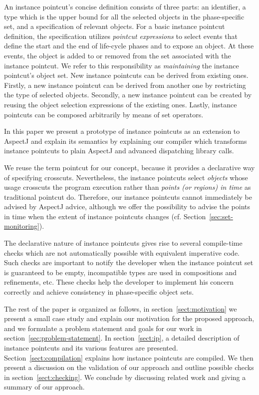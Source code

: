 An instance pointcut's concise definition consists of three parts: an identifier, a type which is the upper bound for all the selected objects in the phase-specific set, and a specification of relevant objects.
For a basic instance pointcut definition, the specification utilizes \emph{pointcut expressions} to select events that define the start and the end of life-cycle phases and to expose an object. At these events, the object is added to or removed from the set associated with the instance pointcut. We refer to this responsibility as \emph{maintaining} the instance pointcut's object set.
New instance pointcuts can be derived from existing ones. Firstly, a new instance pointcut can be derived from another one by restricting the type of selected objects.
Secondly, a new instance pointcut can be created by reusing the object selection expressions of the existing ones.
Lastly, instance pointcuts can be composed arbitrarily by means of set operators.

In this paper we present a prototype of instance pointcuts as an extension to AspectJ \cite{kiczales2001overview} and explain its semantics by explaining our compiler which transforms instance pointcuts to plain AspectJ and advanced dispatching library calls.

We reuse the term pointcut for our concept, because it provides a declarative way of specifying crosscuts.
Nevertheless, the instance pointcuts select \emph{objects} whose usage crosscuts the program execution rather than \emph{points (or regions) in time} \cite{masuharafine} as traditional pointcut do.
Therefore, our instance pointcuts cannot immediately be advised by AspectJ advice, although we offer the possibility to advise the points in time when the extent of instance pointcuts changes (cf. Section~\ref{sec:set-monitoring}).

The declarative nature of instance pointcuts gives rise to several compile-time checks which are not automatically possible with equivalent imperative code.
Such checks are important to notify the developer when the instance pointcut set is guaranteed to be empty, incompatible types are used in compositions and refinements, etc.  These checks help the developer to implement his concern correctly and achieve consistency in phase-specific object sets.


The rest of the paper is organized as follows, in section~\ref{sect:motivation} we present a small case study and explain our motivation for the proposed approach, and we formulate a problem statement and goals for our work in section~\ref{sec:problem-statement}. In section~\ref{sect:ip}, a detailed description of instance pointcuts and its various features are presented. Section~\ref{sect:compilation} explains how instance pointcuts are compiled. We then present a discussion on the validation of our approach and outline possible checks in section~\ref{sect:checking}. We conclude by discussing related work and giving a summary of our approach.


